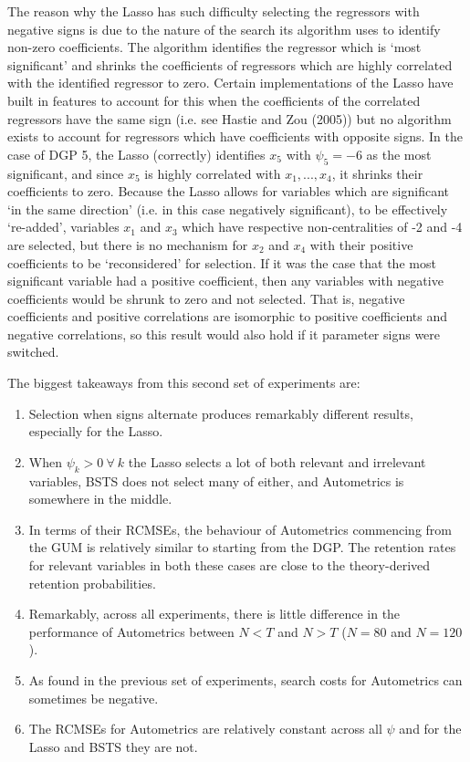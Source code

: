 The reason why the Lasso has such difficulty selecting the regressors with negative signs is due to the nature of the search its algorithm uses to identify non-zero coefficients. The algorithm identifies the regressor which is `most significant' and shrinks the coefficients of regressors which are highly correlated with the identified regressor to zero. Certain implementations of the Lasso have built in features to account for this when the coefficients of the correlated regressors have the same sign (i.e. see Hastie and Zou (2005)) but no algorithm exists to account for regressors which have coefficients with opposite signs. In the case of DGP 5, the Lasso (correctly) identifies $x_{5}$ with $\psi_{5} = -6$ as the most significant, and since $x_{5}$ is highly correlated with $x_{1},...,x_{4}$, it shrinks their coefficients to zero. Because the Lasso allows for variables which are significant `in the same direction' (i.e. in this case negatively significant), to be effectively `re-added', variables $x_{1}$ and $x_{3}$ which have respective non-centralities of -2 and -4 are selected, but there is no mechanism for $x_{2}$ and $x_{4}$ with their positive coefficients to be `reconsidered' for selection. If it was the case that the most significant variable had a positive coefficient, then any variables with negative coefficients would be shrunk to zero and not selected. That is, negative coefficients and positive correlations are isomorphic to positive coefficients and negative correlations, so this result would also hold if it parameter signs were switched.

The biggest takeaways from this second set of experiments are:
\begin{enumerate}
\item Selection when signs alternate produces remarkably different results, especially for the Lasso. 
\item When $\psi_{k} > 0 \ \forall \ k$ the Lasso selects a lot of both relevant and irrelevant variables, BSTS does not select many of either, and Autometrics is somewhere in the middle. 
\item In terms of their RCMSEs, the behaviour of Autometrics commencing from the GUM is relatively similar to starting from the DGP. The retention rates for relevant variables in both these cases are close to the theory-derived retention probabilities.
\item Remarkably, across all experiments, there is little difference in the performance of Autometrics between $N<T$ and $N>T$ ($N=80$ and $N=120$). 
\item As found in the previous set of experiments, search costs for Autometrics can sometimes be negative.
\item The RCMSEs for Autometrics are relatively constant across all $\psi$ and for the Lasso and BSTS they are not. 
\end{enumerate}



